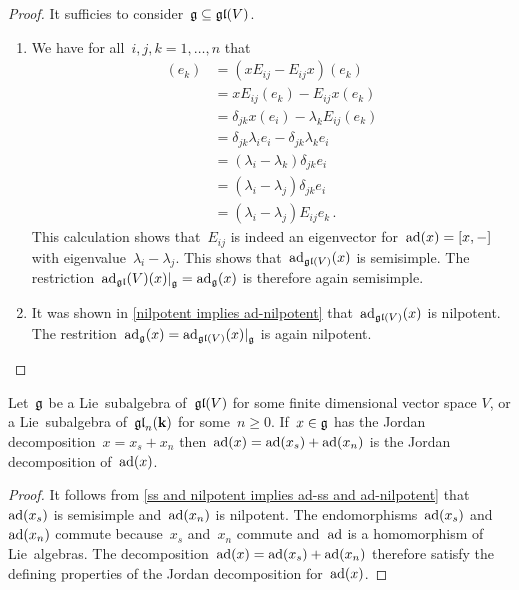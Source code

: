 \begin{proof}
  It sufficies to consider~$\mathfrak{g} \subseteq \mathfrak{gl}(V)$.
  \begin{enumerate}[leftmargin=*]
    \item
      We have for all~$i,j,k = 1, \dotsc, n$ that
      \begin{align*}
        [x,E_{ij}](e_k)
        &=
        (x E_{ij} - E_{ij} x)(e_k)
        \\
        &=
        x E_{ij}(e_k) - E_{ij} x(e_k)
        \\
        &=
        \delta_{jk} x(e_i) - \lambda_k E_{ij}(e_k)
        \\
        &=
        \delta_{jk} \lambda_i e_i - \delta_{jk} \lambda_k e_i
        \\
        &=
        (\lambda_i - \lambda_k) \delta_{jk} e_i
        \\
        &=
        (\lambda_i - \lambda_j) \delta_{jk} e_i
        \\
        &=
        (\lambda_i - \lambda_j) E_{ij} e_k  \,.
      \end{align*}
      This calculation shows that~$E_{ij}$ is indeed an eigenvector for~$\operatorname{ad}(x) = [x,-]$ with eigenvalue~$\lambda_i - \lambda_j$.
      This shows that~$\operatorname{ad}_{\mathfrak{gl}(V)}(x)$ is semisimple.
      The restriction~$\restrict{\ad_{\gllie}(V)(x)}{\glie} = \ad_{\glie}(x)$ is therefore again semisimple.
    \item
      It was shown in \cref{nilpotent implies ad-nilpotent} that~$\operatorname{ad}_{\mathfrak{gl}(V)}(x)$ is nilpotent.
      The restrition~$\ad_{\glie}(x) = \restrict{\ad_{\gllie(V)}(x)}{\glie}$ is again nilpotent.
    \qedhere
  \end{enumerate}
\end{proof}


\begin{corollary}
  \label{concrete jordan decomposition compatible with adjoint representation}
  Let~$\mathfrak{g}$ be a Lie~subalgebra of~$\mathfrak{gl}(V)$ for some finite dimensional vector space $V$, or a Lie~subalgebra of~$\mathfrak{gl}_n(\mathbf{k})$ for some~$n \geq 0$.
  If~$x \in \mathfrak{g}$ has the Jordan decomposition~$x = x_s + x_n$ then~$\operatorname{ad}(x) = \operatorname{ad}(x_s) + \operatorname{ad}(x_n)$ is the Jordan decomposition of~$\operatorname{ad}(x)$.
\end{corollary}


\begin{proof}
  It follows from \cref{ss and nilpotent implies ad-ss and ad-nilpotent} that~$\operatorname{ad}(x_s)$ is semisimple and~$\operatorname{ad}(x_n)$ is nilpotent.
  The endomorphisms~$\operatorname{ad}(x_s)$ and~$\operatorname{ad}(x_n)$ commute because~$x_s$ and~$x_n$ commute and~$\operatorname{ad}$ is a homomorphism of Lie~algebras.
  The decomposition~$\operatorname{ad}(x) = \operatorname{ad}(x_s) + \operatorname{ad}(x_n)$ therefore satisfy the defining properties of the Jordan decomposition for~$\operatorname{ad}(x)$.
\end{proof}






